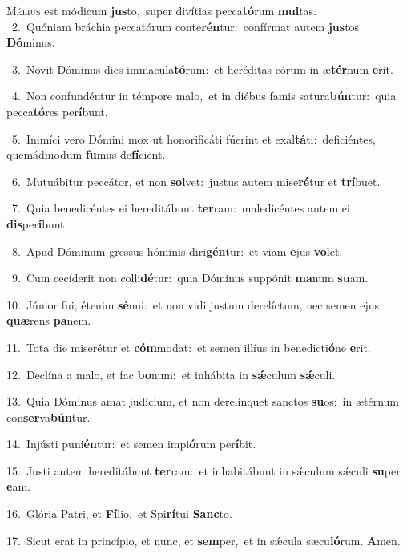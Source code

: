 \lettrine{\initial\textcolor{\initialcolor}{M}}{élius} est módicum \textbf{jus}\-to,~\star super divítias pecca\-\textbf{tó}\-rum \textbf{mul}\-tas.\\
{\numbfont\textcolor{\numbcolor}{~2.}}~Quóniam bráchia peccatórum conte\-\textbf{rén}\-tur:~\star confírmat autem \textbf{jus}\-tos \textbf{Dó}\-minus.\par
{\numbfont\textcolor{\numbcolor}{~3.}}~Novit Dóminus dies immacula\-\textbf{tó}\-rum:~\star et heréditas eórum in æ\-\textbf{tér}\-num \textbf{e}\-rit.\par
{\numbfont\textcolor{\numbcolor}{~4.}}~Non confundéntur in témpore malo,~\dagger et in diébus famis satura\-\textbf{bún}\-tur:~\star quia pecca\-\textbf{tó}\-res per\-\textbf{í}\-bunt.\par
{\numbfont\textcolor{\numbcolor}{~5.}}~Inimíci vero Dómini mox ut honorificáti fúerint et exal\-\textbf{tá}\-ti:~\star deficiéntes, quemádmodum \textbf{fu}\-mus de\-\textbf{fí}\-cient.\par
{\numbfont\textcolor{\numbcolor}{~6.}}~Mutuábitur peccátor, et non \textbf{sol}\-vet:~\star justus autem mise\-\textbf{ré}\-tur et \textbf{trí}\-buet.\par
{\numbfont\textcolor{\numbcolor}{~7.}}~Quia benedicéntes ei hereditábunt \textbf{ter}\-ram:~\star maledicéntes autem ei \textbf{dis}\-per\-\textbf{í}\-bunt.\par
{\numbfont\textcolor{\numbcolor}{~8.}}~Apud Dóminum gressus hóminis diri\-\textbf{gén}\-tur:~\star et viam \textbf{e}\-jus \textbf{vo}\-let.\par
{\numbfont\textcolor{\numbcolor}{~9.}}~Cum cecíderit non colli\-\textbf{dé}\-tur:~\star quia Dóminus suppónit \textbf{ma}\-num \textbf{su}\-am.\par
{\numbfont\textcolor{\numbcolor}{10.}}~Júnior fui, étenim \textbf{sé}\-nui:~\star et non vidi justum derelíctum, nec semen ejus \textbf{quæ}\-rens \textbf{pa}\-nem.\par
{\numbfont\textcolor{\numbcolor}{11.}}~Tota die miserétur et \textbf{cóm}\-modat:~\star et semen illíus in benedicti\-\textbf{ó}\-ne \textbf{e}\-rit.\par
{\numbfont\textcolor{\numbcolor}{12.}}~Declína a malo, et fac \textbf{bo}\-num:~\star et inhábita in \textbf{sǽ}\-culum \textbf{sǽ}\-culi.\par
{\numbfont\textcolor{\numbcolor}{13.}}~Quia Dóminus amat judícium, et non derelínquet sanctos \textbf{su}\-os:~\star in ætérnum con\-\textbf{ser}\-va\-\textbf{bún}\-tur.\par
{\numbfont\textcolor{\numbcolor}{14.}}~Injústi puni\-\textbf{én}\-tur:~\star et semen impi\-\textbf{ó}\-rum per\-\textbf{í}\-bit.\par
{\numbfont\textcolor{\numbcolor}{15.}}~Justi autem hereditábunt \textbf{ter}\-ram:~\star et inhabitábunt in sǽculum sǽculi \textbf{su}\-per \textbf{e}\-am.\par
{\numbfont\textcolor{\numbcolor}{16.}}~Glória Patri, et \textbf{Fí}\-lio,~\star et Spi\-\textbf{rí}\-tui \textbf{Sanc}\-to.\par
{\numbfont\textcolor{\numbcolor}{17.}}~Sicut erat in princípio, et nunc, et \textbf{sem}\-per,~\star et in sǽcula sæcu\-\textbf{ló}\-rum. \textbf{A}\-men.\par
